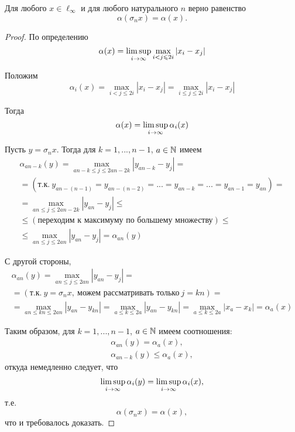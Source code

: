 \begin{theorem}
	\label{thm:alpha_sigma_n}
	Для любого $x\in\ell_\infty$ и для любого натурального $n$ верно равенство
	\begin{equation}
		\alpha(\sigma_n x) = \alpha(x)
		.
	\end{equation}
\end{theorem}

\begin{proof}
	По определению
	\begin{equation}
		\alpha(x) = \varlimsup_{i\to\infty} \max_{i<j\leqslant 2i} |x_i - x_j|
	\end{equation}

	Положим
	\begin{equation}
		\alpha_i(x) =
		\max_{i<j\leqslant 2i} |x_i - x_j| =
		\max_{i\leqslant j\leqslant 2i} |x_i - x_j|
	\end{equation}

	Тогда
	\begin{equation}
		\alpha(x) = \varlimsup_{i\to\infty} \alpha_i(x)
	\end{equation}

	Пусть $y = \sigma_n x$.
	Тогда для $k=1, ..., n-1$, $a\in\N$ имеем
	\begin{multline}
		\alpha_{an-k}(y) =
		\max_{an-k \leqslant j \leqslant 2an-2k} |y_{an-k} - y_j| =
		\\=
		(\mbox{т.к.}~y_{an-(n-1)}=y_{an-(n-2)}=...=y_{an-k}=...=y_{an-1}=y_{an})=
		\\=
		\max_{an \leqslant j \leqslant 2an-2k} |y_{an} - y_j| \leqslant
		\\ \leqslant
		(\mbox{переходим к максимуму по большему множеству}) \leqslant
		\\ \leqslant
		\max_{an \leqslant j \leqslant 2an} |y_{an} - y_j| =
		\alpha_{an}(y)
	\end{multline}

	С другой стороны,
	\begin{multline}
		\alpha_{an}(y) =
		\max_{an \leqslant j \leqslant 2an} |y_{an} - y_j| =
		\\ =
		(\mbox{т.к.}~y=\sigma_n x,~\mbox{можем рассматривать только}~j=kn)=
		\\ =
		\max_{an \leqslant kn \leqslant 2an} |y_{an} - y_{kn}| =
		\max_{a \leqslant k \leqslant 2a} |y_{an} - y_{kn}| =
		\max_{a \leqslant k \leqslant 2a} |x_a - x_k| =
		\alpha_a(x)
	\end{multline}

	Таким образом, для $k=1, ..., n-1$, $a\in\N$ имеем соотношения:
	\begin{gather}
		\alpha_{an}(y) = \alpha_a(x),
	\\
		\alpha_{an-k}(y) \leqslant \alpha_a(x),
	\end{gather}
	откуда немедленно следует, что
	\begin{equation}
		\varlimsup_{i\to\infty} \alpha_i(y) =
		\varlimsup_{i\to\infty} \alpha_i(x),
	\end{equation}
	т.е.
	\begin{equation}
		\alpha(\sigma_n x) = \alpha(x),
	\end{equation}
	что и требовалось доказать.
\end{proof}

